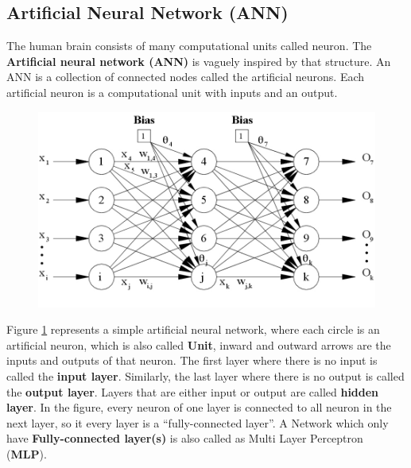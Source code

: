 \subsection{Artificial Neural Network (ANN)}
The human brain consists of many computational units called neuron. The \textbf{Artificial neural network (ANN)} is vaguely inspired by that structure. An ANN is a collection of connected nodes called the artificial neurons. Each artificial neuron is a computational unit with inputs and an output.
\begin{center}
	\begin{figure}[H]
		\centering
		\includegraphics[width=0.75\columnwidth]{images/chap2/NeuralNetwork.jpg}
		\label{chap2:neural_net}
	\end{figure}
\end{center}
\vspace{-1cm}
Figure \ref{chap2:neural_net} represents a simple artificial neural network, where each circle is an artificial neuron, which is also called \textbf{Unit}, inward and outward arrows are the inputs and outputs of that neuron. The first layer where there is no input is called the \textbf{input layer}. Similarly, the last layer where there is no output is called the \textbf{output layer}. Layers that are either input or output are called \textbf{hidden layer}. In the figure, every neuron of one layer is connected to all neuron in the next layer, so it every layer is a “fully-connected layer”. A Network which only have \textbf{Fully-connected layer(s)} is also called as Multi Layer Perceptron (\textbf{MLP}).
